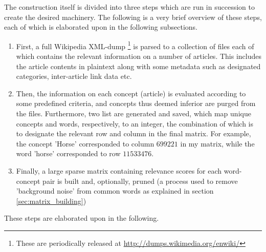 The construction itself is divided into three steps which are run in succession to create the desired machinery. The following is a very brief overview of these steps, each of which is elaborated upon in the following subsections.
\begin{enumerate}
	\item First, a full Wikipedia XML-dump%
	\footnote{These are periodically released at \url{http://dumps.wikimedia.org/enwiki/}}
	is parsed to a collection of files each of which contains the relevant information on a number of articles. This includes the article contents in plaintext along with some metadata such as designated categories, inter-article link data etc.
	\item Then, the information on each concept (article) is evaluated according to some predefined criteria, and concepts thus deemed inferior are purged from the files. Furthermore, two list are generated and saved, which map unique concepts and words, respectively, to an integer, the combination of which is to designate the relevant row and column in the final matrix. For example, the concept 'Horse' corresponded to column $699221$ in my matrix, while the word 'horse' corresponded to row $11533476$.
	\item Finally, a large sparse matrix containing relevance scores for each word-concept pair is built and, optionally, pruned (a process used to remove 'background noise' from common words as explained in section \ref{sec:matrix_building})
\end{enumerate}
These steps are elaborated upon in the following.

